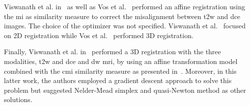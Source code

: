 Viswanath et al. in~\cite{Viswanath2008a,Viswanath2009} as well as Vos et al.~\cite{Vos2008} performed an affine registration using the \ac{mi} as similarity measure to correct the misalignment between \ac{t2w} and \ac{dce} images. The choice of the optimizer was not specified. Viswanath et al.~\cite{Viswanath2008a,Viswanath2009} focused on 2D registration while Vos et al.~\cite{Vos2008} performed 3D registration.

Finally, Viswanath et al. in~\cite{Viswanath2011} performed a 3D registration with the three modalities, \ac{t2w} and \ac{dce} and \ac{dw} \ac{mri}, by using an affine transformation model combined with the \ac{cmi} similarity measure as presented in~\cite{Chappelow2011}. Moreover, in this latter work, the authors employed a gradient descent approach to solve this problem but suggested Nelder-Mead simplex and quasi-Newton method as other solutions.

